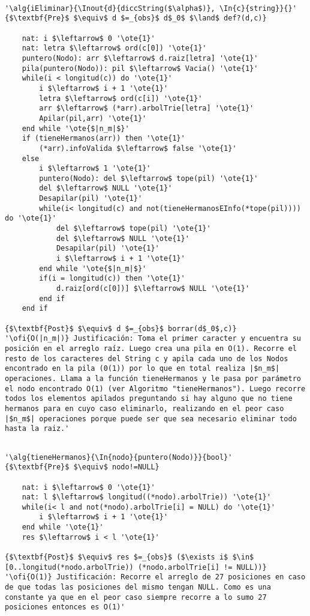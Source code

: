 \begin{lstlisting}[mathescape]

'\alg{iEliminar}{\Inout{d}{diccString($\alpha$)}, \In{c}{string}}{}'
{$\textbf{Pre}$ $\equiv$ d $=_{obs}$ d$_0$ $\land$ def?(d,c)}

	nat: i $\leftarrow$ 0 '\ote{1}'
	nat: letra $\leftarrow$ ord(c[0]) '\ote{1}'
	puntero(Nodo): arr $\leftarrow$ d.raiz[letra] '\ote{1}'
	pila(puntero(Nodo)): pil $\leftarrow$ Vacia() '\ote{1}'
	while(i < longitud(c)) do '\ote{1}'
		i $\leftarrow$ i + 1 '\ote{1}'
		letra $\leftarrow$ ord(c[i]) '\ote{1}'
		arr $\leftarrow$ (*arr).arbolTrie[letra] '\ote{1}'
		Apilar(pil,arr) '\ote{1}'
	end while '\ote{$|n_m|$}'
	if (tieneHermanos(arr)) then '\ote{1}'
		(*arr).infoValida $\leftarrow$ false '\ote{1}'
	else
		i $\leftarrow$ 1 '\ote{1}'
		puntero(Nodo): del $\leftarrow$ tope(pil) '\ote{1}'
		del $\leftarrow$ NULL '\ote{1}'
		Desapilar(pil) '\ote{1}'
		while(i< longitud(c) and not(tieneHermanosEInfo(*tope(pil)))) do '\ote{1}'
			del $\leftarrow$ tope(pil) '\ote{1}'
			del $\leftarrow$ NULL '\ote{1}'
			Desapilar(pil) '\ote{1}'
			i $\leftarrow$ i + 1 '\ote{1}'
		end while '\ote{$|n_m|$}'
		if(i = longitud(c)) then '\ote{1}'
			d.raiz[ord(c[0])] $\leftarrow$ NULL '\ote{1}'
		end if
	end if

{$\textbf{Post}$ $\equiv$ d $=_{obs}$ borrar(d$_0$,c)}
'\ofi{O(|n_m|)} Justificación: Toma el primer caracter y encuentra su posición en el arreglo raíz. Luego crea una pila en O(1). Recorre el resto de los caracteres del String c y apila cada uno de los Nodos encontrado en la pila (0(1)) por lo que en total realiza |$n_m$| operaciones. Llama a la función tieneHermanos y le pasa por parámetro el nodo encontrado O(1) (ver Algoritmo "tieneHermanos"). Luego recorre todos los elementos apilados preguntando si hay alguno que no tiene hermanos para en cuyo caso eliminarlo, realizando en el peor caso |$n_m$| operaciones porque puede ser que sea necesario eliminar todo hasta la raiz.'

\end{lstlisting}

\begin{lstlisting}[mathescape]

'\alg{tieneHermanos}{\In{nodo}{puntero(Nodo)}}{bool}'
{$\textbf{Pre}$ $\equiv$ nodo!=NULL} 

	nat: i $\leftarrow$ 0 '\ote{1}'
	nat: l $\leftarrow$ longitud((*nodo).arbolTrie)) '\ote{1}'
	while(i< l and not(*nodo).arbolTrie[i] = NULL) do '\ote{1}'
		i $\leftarrow$ i + 1 '\ote{1}'
	end while '\ote{1}' 
	res $\leftarrow$ i < l '\ote{1}'

{$\textbf{Post}$ $\equiv$ res $=_{obs}$ ($\exists i$ $\in$ [0..longitud(*nodo.arbolTrie)) (*nodo.arbolTrie[i] != NULL))}
'\ofi{O(1)} Justificación: Recorre el arreglo de 27 posiciones en caso de que todas las posiciones del mismo tengan NULL. Como es una constante ya que en el peor caso siempre recorre a lo sumo 27 posiciones entonces es O(1)'

\end{lstlisting}

